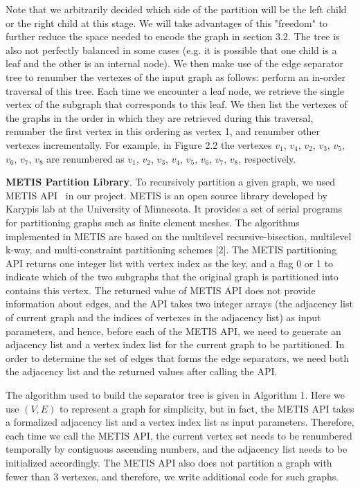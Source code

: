 \documentclass[12pt,glossary]{dalthesis}
\begin{document}
\bigskip
\bigskip
Note that we arbitrarily decided which side of the partition will be the left child or the right child at this stage. We will take advantages of this "freedom" to further reduce the space needed to encode the graph in section 3.2. The tree is also not perfectly balanced in some cases (e.g. it is possible that one child is a leaf and the other is an internal node). We then make use of the edge separator tree to renumber the vertexes of the input graph as follows: perform an in-order traversal of this tree. Each time we encounter a leaf node, we retrieve the single vertex of the subgraph that corresponds to this leaf. We then list the vertexes of the graphs in the order in which they are retrieved during this traversal, renumber the first vertex in this ordering as vertex 1, and renumber other vertexes incrementally. For example, in Figure 2.2 the vertexes $v_{1}$, $v_{4}$, $v_{2}$, $v_{3}$, $v_{5}$, $v_{6}$, $v_{7}$, $v_{8}$ are renumbered as $v_{1}$, $v_{2}$, $v_{3}$, $v_{4}$, $v_{5}$, $v_{6}$, $v_{7}$, $v_{8}$, respectively.

\bigskip
\bigskip

\textbf{METIS Partition Library}. To recursively partition a given graph, we used METIS API~\cite{metis-lib} in our project. METIS is an open source library developed by Karypis lab at the University of Minnesota. It provides a set of serial programs for partitioning graphs such as finite element meshes. The algorithms implemented in METIS are based on the multilevel recursive-bisection, multilevel k-way, and multi-constraint partitioning schemes [2]. The METIS partitioning API returns one integer list with vertex index as the key, and a flag 0 or 1 to indicate which of the two subgraphs that the original graph is partitioned into contains this vertex. The returned value of METIS API does not provide information about edges, and the API takes two integer arrays (the adjacency list of current graph and the indices of vertexes in the adjacency list) as input parameters, and hence, before each of the METIS API, we need to generate an adjacency list and a vertex index list for the current graph to be partitioned. In order to determine the set of edges that forms the edge separators, we need both the adjacency list and the returned values after calling the API.

\bigskip
\bigskip

The algorithm used to build the separator tree is given in Algorithm 1. Here we use $(V,E)$
to represent a graph for simplicity, but in fact, the METIS API takes a formalized adjacency list and a vertex index list as input parameters. Therefore, each time we call the METIS API, the current vertex set needs to be renumbered temporally by contiguous ascending numbers, and the adjacency list needs to be initialized accordingly. The METIS API also does not partition a graph with fewer than 3 vertexes, and therefore, we write additional code for such graphs.
\end{document}
